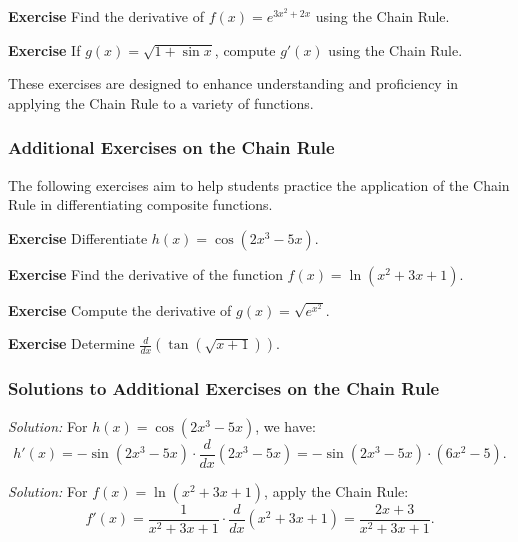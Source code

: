 \documentclass[a4paper,12pt]{book}
\newenvironment{exercise}[1][]
  {\par\medskip\noindent\textbf{Exercise #1} \rmfamily}
  {\medskip}
\newenvironment{solution}[1][]
{\par\noindent\textit{Solution:} \rmfamily}{\medskip}
\begin{document}
\begin{exercise}
Find the derivative of \( f(x) = e^{3x^2 + 2x} \) using the Chain Rule.
\end{exercise}

\begin{exercise}
If \( g(x) = \sqrt{1 + \sin x} \), compute \( g'(x) \) using the Chain Rule.
\end{exercise}

These exercises are designed to enhance understanding and proficiency in applying the Chain Rule to a variety of functions.

\subsubsection*{Additional Exercises on the Chain Rule}

The following exercises aim to help students practice the application of the Chain Rule in differentiating composite functions.

\begin{exercise}
Differentiate \( h(x) = \cos(2x^3 - 5x) \).
\end{exercise}

\begin{exercise}
Find the derivative of the function \( f(x) = \ln(x^2 + 3x + 1) \).
\end{exercise}

\begin{exercise}
Compute the derivative of \( g(x) = \sqrt{e^{x^2}} \).
\end{exercise}

\begin{exercise}
Determine \( \frac{d}{dx} \left( \tan(\sqrt{x + 1}) \right) \).
\end{exercise}

\subsubsection*{Solutions to Additional Exercises on the Chain Rule}

\begin{solution}[to Exercise 1]
For \( h(x) = \cos(2x^3 - 5x) \), we have:
\[ h'(x) = -\sin(2x^3 - 5x) \cdot \frac{d}{dx}(2x^3 - 5x) = -\sin(2x^3 - 5x) \cdot (6x^2 - 5). \]
\end{solution}

\begin{solution}[to Exercise 2]
For \( f(x) = \ln(x^2 + 3x + 1) \), apply the Chain Rule:
\[ f'(x) = \frac{1}{x^2 + 3x + 1} \cdot \frac{d}{dx}(x^2 + 3x + 1) = \frac{2x + 3}{x^2 + 3x + 1}. \]
\end{solution}
\end{document}
